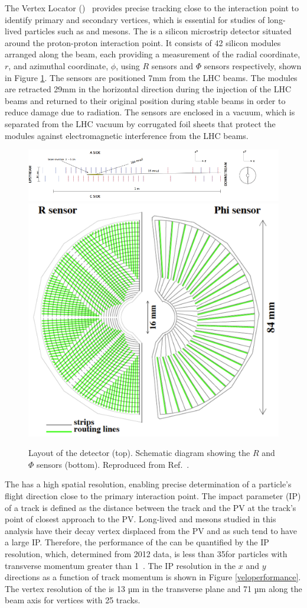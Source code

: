 The Vertex Locator (\velo)~\cite{LHCb-DP-2014-001} provides precise tracking close to the interaction point to identify primary and secondary vertices, which is essential for studies of long-lived particles such as \B and \D mesons. The \velo is a silicon microstrip detector situated around the proton-proton interaction point. It consists of 42 silicon modules arranged along the beam, each providing a measurement of the radial coordinate, $r$, and azimuthal coordinate, $\phi$, using $R$ sensors and $\Phi$ sensors respectively, shown in Figure \ref{velolayout}. The sensors are positioned 7mm from the LHC beams. The \velo modules are retracted 29mm in the horizontal direction during the injection of the LHC beams and returned to their original position during stable beams in order to reduce damage due to radiation. The sensors are enclosed in a vacuum, which is separated from the LHC vacuum by corrugated foil sheets that protect the \velo modules against electromagnetic interference from the LHC beams.

\begin{figure}
\centering
\includegraphics[width=\linewidth]{figures/detector/VELO_detector_layout_crop.pdf}
\hfill
\includegraphics[width=0.3\linewidth]{figures/detector/randphisensors.pdf}
\caption{Layout of the \velo detector (top). Schematic diagram showing the $R$ and $\Phi$ sensors (bottom). Reproduced from Ref.~\cite{LHCb-DP-2014-002}.}
\label{velolayout}
\end{figure}

The \velo has a high spatial resolution, enabling precise determination of a particle's flight direction close to the primary interaction point. The impact parameter (IP) of a track is defined  as the distance between the track and the PV at the track's point of closest approach to the PV. Long-lived \B and \D mesons studied in this analysis have their decay vertex displaced from the PV and as such tend to have a large IP. Therefore, the performance of the \velo can be quantified by the IP resolution, which, determined from 2012 data, is less than 35\mum for particles with transverse momentum greater than 1\gevc~\cite{LHCb-DP-2014-001}. The IP resolution in the $x$ and $y$ directions as a function of track momentum is shown in Figure \ref{veloperformance}. The vertex resolution of the \velo is 13 µm in the transverse plane and 71 µm along the beam axis for vertices with 25 tracks.

